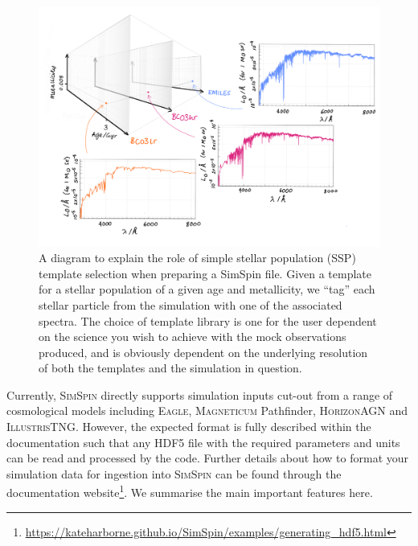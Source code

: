 \documentclass[
  journal=pasa,
  manuscript=research-paper, %
  year=2020,
  volume=37,
]{cup-journal}
\newcommand{\simspin}[1]{\textsc{SimSpin}#1} %
\newcommand{\eagle}[1]{\textsc{Eagle}#1} %
\newcommand{\magneticum}[1]{\textsc{Magneticum}#1} %
\newcommand{\illustristng}[1]{\textsc{IllustrisTNG}#1} %
\newcommand{\horizon}[1]{\textsc{HorizonAGN}#1} %
\begin{document}
\begin{figure}
    \centering
    \includegraphics[keepaspectratio, width=14cm]{Figures/simspin_file_method.png}
    \caption{A diagram to explain the role of simple stellar population (SSP) template selection when preparing a SimSpin file. Given a template for a stellar population of a given age and metallicity, we ``tag'' each stellar particle from the simulation with one of the associated spectra. The choice of template library is one for the user dependent on the science you wish to achieve with the mock observations produced, and is obviously dependent on the underlying resolution of both the templates and the simulation in question.}
    \label{fig:SSP_template_selection}
\end{figure}

Currently, \simspin{} directly supports simulation inputs cut-out from a range of cosmological models including \eagle{}, \magneticum{} Pathfinder, \horizon{} and \illustristng. 
However, the expected format is fully described within the documentation such that any HDF5 file with the required parameters and units can be read and processed by the code. 
Further details about how to format your simulation data for ingestion into \simspin{} can be found through the documentation website\footnote{\url{https://kateharborne.github.io/SimSpin/examples/generating_hdf5.html}}.
We summarise the main important features here. 
\end{document}
